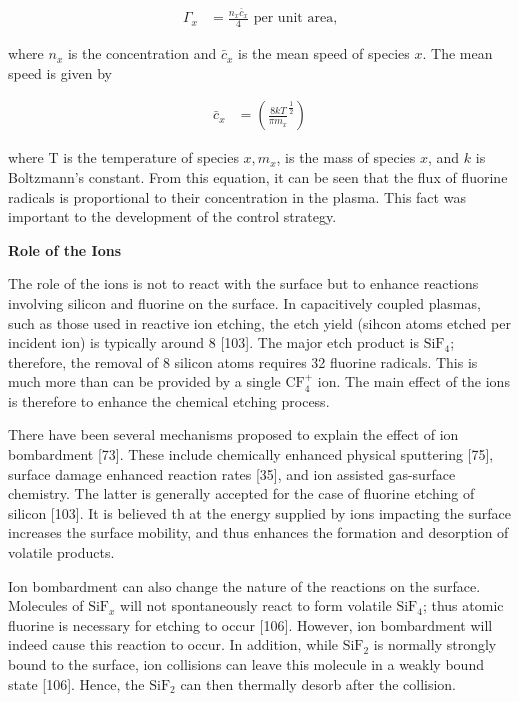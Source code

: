\begin{align}
	\Gamma_{x} &= \frac{n_{x}\bar{c}_{x}}{4} \text{ per unit area,}
\end{align}

\noindent where $n_{x}$ is the concentration and $\bar{c}_{x}$ is the mean speed of species $x$. The mean speed is given by

\begin{align}
	\bar{c}_{x} &= \left( \frac{8kT}{\pi m_{x}}^{\frac{1}{2}} \right)
\end{align}

\noindent where T is the temperature of species $x, m_{x}$, is the mass of species $x$, and $k$ is Boltzmann’s constant. From this equation, it can be seen that the flux of fluorine radicals is proportional to their concentration in the plasma. This fact was important to the development of the control strategy.

\noindent\large\bf Role of the Ions

\normalsize\normalfont The role of the ions is not to react with the surface but to enhance reactions involving silicon and fluorine on the surface. In capacitively coupled plasmas, such as those used in reactive ion etching, the etch yield (sihcon atoms etched per incident ion) is typically around 8 [103]. The major etch product is $\text{SiF}_{4}$; therefore, the removal of 8 silicon atoms requires 32 fluorine radicals. This is much more than can be provided by a single $\text{CF}^{+}_{4}$ ion. The main effect of the ions is therefore to enhance the chemical etching process.


There have been several mechanisms proposed to explain the effect of ion bombardment [73]. These include chemically enhanced physical sputtering [75], surface damage enhanced reaction rates [35], and ion assisted gas-surface chemistry. The latter is generally accepted for the case of fluorine etching of silicon [103]. It is believed th at the energy supplied by ions impacting the surface increases the surface mobility, and thus enhances the formation and desorption of volatile products.


Ion bombardment can also change the nature of the reactions on the surface. Molecules of $\text{SiF}_{x}$ will not spontaneously react to form volatile $\text{SiF}_{4}$; thus atomic fluorine is necessary for etching to occur [106]. However, ion bombardment will indeed cause this reaction to occur. In addition, while $\text{SiF}_{2}$ is normally strongly bound to the surface, ion collisions can leave this molecule in a weakly bound state [106]. Hence, the $\text{SiF}_{2}$ can then thermally desorb after the collision.


